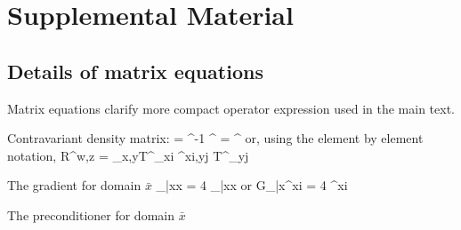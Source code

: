 \documentclass[aps,prl,twocolumn,reprint,amsmath,amssymb]{revtex4-1}
\begin{document}


\section{Supplemental Material}

\setcounter{equation}{0}
\setcounter{figure}{0}

\renewcommand{\theequation}{S\arabic{equation}}
\renewcommand{\thefigure}{S\arabic{figure}}

\subsection{Details of matrix equations}
Matrix equations clarify more compact operator expression used in the main text. 


Contravariant density matrix:
%
\bea
{} =  \sigma^{-1} ^{\dagger}
\sigma = ^{\dagger}  
\eea
%
or, using the element by element notation,
%
\bea
R^{w\mu,z\nu} = \sum_{x,y}{T^{\mu}}_{xi} \sigma^{xi,yj} {T^{\nu}}_{yj}
\eea

The gradient for domain $\bar{x}$
%
\bea
{}_{\bar{x}x} = 4 _{\bar{x}x}
\eea
%
or
%
\bea
{G_{\bar{x}\mu}}^{xi} = 4 ^{xi}
\eea
%

The preconditioner for domain $\bar{x}$ 
\end{document}
